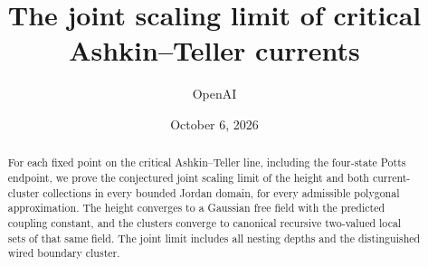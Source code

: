 \documentclass[11pt]{article}
\title{The joint scaling limit of critical Ashkin--Teller currents}
\author{OpenAI}
\date{October 6, 2026}
\theoremstyle{definition}
\numberwithin{equation}{section}
\begin{document}
\maketitle
\begin{abstract}
For each fixed point on the critical Ashkin--Teller line, including the
four-state Potts endpoint, we prove the conjectured joint scaling limit
of the height and both current-cluster collections in every bounded
Jordan domain, for every admissible polygonal approximation. The height
converges to a Gaussian free field with the predicted coupling constant,
and the clusters converge to canonical recursive two-valued local sets
of that same field. The joint limit includes all nesting depths and the
distinguished wired boundary cluster.
\end{abstract}
\tableofcontents









\appendix

\begingroup
\small


\endgroup
\end{document}
